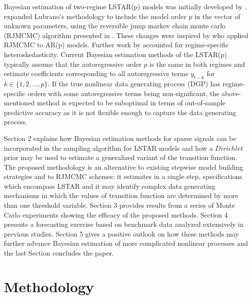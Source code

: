 Bayesian estimation of two-regime LSTAR(p) models was initially developed by \citep{Lubrano2000}. \citep{Lopes2006} expanded Lubrano's methodology to include the model order $p$ in the vector of unknown parameters, using the reversible jump markov chain monte carlo (RJMCMC) algorithm presented in \cite{Green1995}. These changes were inspired by \citep{Troughton1997} who applied RJMCMC to AR(p) models. Further work by \citep{Gerlach2008} accounted for regime-specific heteroskedasticity. Current Bayesian estimation methods of the LSTAR(p) typically assume that the autoregressive order $p$ is the same in both regimes and estimate coefficients corresponding to all autoregressive terms $y_{t-k}$ for $k \in \{1,2,...,p\}$. If the true nonlinear data generating process (DGP) has regime-specific orders with some autoregressive terms being non-significant, the above-mentioned method is expected to be suboptimal in terms of out-of-sample predictive accuracy as it is not flexible enough to capture the data generating process. 

Section 2 explains how Bayesian estimation methods for sparse signals can be incorporated in the sampling algorithm for LSTAR models and how a $Dirichlet$ prior may be used to estimate a generalized variant of the transition function. The proposed methodology is an alternative to existing stepwise model building strategies and to RJMCMC schemes: it estimates in a single step, specifications which encompass LSTAR and it may identify complex data generating mechanisms in which the values of transition function are determined by more than one threshold variable. Section 3 provides results from a series of Monte Carlo experiments showing the efficacy of the proposed methods. Section 4 presents a forecasting exercise based on benchmark data analyzed extensively in previous studies. Section 5 gives a positive outlook on how these methods may further advance Bayesian estimation of more complicated nonlinear processes and the last Section concludes the paper.



\section{Methodology}


